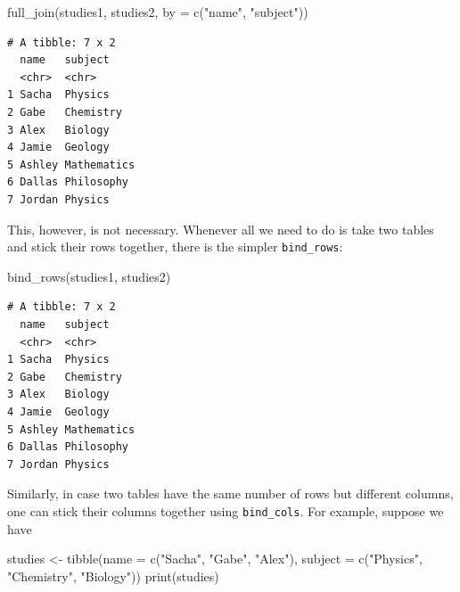 \documentclass[
  letterpaper,
  DIV=11,
  numbers=noendperiod]{scrreprt}
\newenvironment{Shaded}{\begin{snugshade}}{\end{snugshade}}
\newcommand{\AttributeTok}[1]{\textcolor[rgb]{0.40,0.45,0.13}{#1}}
\newcommand{\FunctionTok}[1]{\textcolor[rgb]{0.28,0.35,0.67}{#1}}
\newcommand{\NormalTok}[1]{\textcolor[rgb]{0.00,0.23,0.31}{#1}}
\newcommand{\OtherTok}[1]{\textcolor[rgb]{0.00,0.23,0.31}{#1}}
\newcommand{\StringTok}[1]{\textcolor[rgb]{0.13,0.47,0.30}{#1}}
\begin{document}
\begin{Shaded}
\begin{Highlighting}[]
\FunctionTok{full\_join}\NormalTok{(studies1, studies2, }\AttributeTok{by =} \FunctionTok{c}\NormalTok{(}\StringTok{"name"}\NormalTok{, }\StringTok{"subject"}\NormalTok{))}
\end{Highlighting}
\end{Shaded}

\begin{verbatim}
# A tibble: 7 x 2
  name   subject    
  <chr>  <chr>      
1 Sacha  Physics    
2 Gabe   Chemistry  
3 Alex   Biology    
4 Jamie  Geology    
5 Ashley Mathematics
6 Dallas Philosophy 
7 Jordan Physics    
\end{verbatim}

This, however, is not necessary. Whenever all we need to do is take two
tables and stick their rows together, there is the simpler
\texttt{bind\_rows}:

\begin{Shaded}
\begin{Highlighting}[]
\FunctionTok{bind\_rows}\NormalTok{(studies1, studies2)}
\end{Highlighting}
\end{Shaded}

\begin{verbatim}
# A tibble: 7 x 2
  name   subject    
  <chr>  <chr>      
1 Sacha  Physics    
2 Gabe   Chemistry  
3 Alex   Biology    
4 Jamie  Geology    
5 Ashley Mathematics
6 Dallas Philosophy 
7 Jordan Physics    
\end{verbatim}

Similarly, in case two tables have the same number of rows but different
columns, one can stick their columns together using \texttt{bind\_cols}.
For example, suppose we have

\begin{Shaded}
\begin{Highlighting}[]
\NormalTok{studies }\OtherTok{\textless{}{-}} \FunctionTok{tibble}\NormalTok{(}\AttributeTok{name    =} \FunctionTok{c}\NormalTok{(}\StringTok{"Sacha"}\NormalTok{, }\StringTok{"Gabe"}\NormalTok{, }\StringTok{"Alex"}\NormalTok{),}
                  \AttributeTok{subject =} \FunctionTok{c}\NormalTok{(}\StringTok{"Physics"}\NormalTok{, }\StringTok{"Chemistry"}\NormalTok{, }\StringTok{"Biology"}\NormalTok{))}
\FunctionTok{print}\NormalTok{(studies)}
\end{Highlighting}
\end{Shaded}
\end{document}
